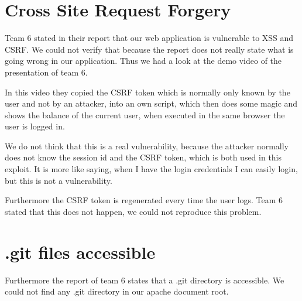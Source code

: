 \chapter{Cross Site Request Forgery}

Team 6 stated in their report that our web application is vulnerable to XSS and CSRF. We could not verify that because the report does not really state what is going wrong in our application. Thus we had a look at the demo video of the presentation of team 6.

In this video they copied the CSRF token which is normally only known by the user and not by an attacker, into an own script, which then does some magic and shows the balance of the current user, when executed in the same browser the user is logged in.

We do not think that this is a real vulnerability, because the attacker normally does not know the session id and the CSRF token, which is both used in this exploit. It is more like saying, when I have the login credentials I can easily login, but this is not a vulnerability.

Furthermore the CSRF token is regenerated every time the user logs. Team 6 stated that this does not happen, we could not reproduce this problem.

\chapter{.git files accessible}

Furthermore the report of team 6 states that a .git directory is accessible. We could not find any .git directory in our apache document root. 